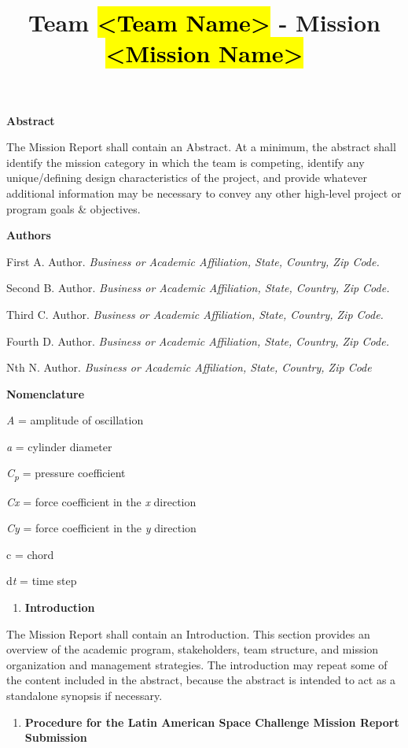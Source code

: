 \documentclass[
]{article}
\title{Team \hl{\textless Team Name\textgreater{}} - Mission
\hl{\textless Mission Name\textgreater{}}}
\author{}
\date{}
\begin{document}
\maketitle

\textbf{Abstract}

The Mission Report shall contain an Abstract. At a minimum, the abstract
shall identify the mission category in which the team is competing,
identify any unique/defining design characteristics of the project, and
provide whatever additional information may be necessary to convey any
other high-level project or program goals \& objectives.

\textbf{Authors}

First A. Author. \emph{Business or Academic Affiliation, State, Country,
Zip Code.}

Second B. Author. \emph{Business or Academic Affiliation, State,
Country, Zip Code.}

Third C. Author. \emph{Business or Academic Affiliation, State, Country,
Zip Code.}

Fourth D. Author. \emph{Business or Academic Affiliation, State,
Country, Zip Code.}

Nth N. Author. \emph{Business or Academic Affiliation, State, Country,
Zip Code}

\textbf{Nomenclature}

\emph{A} = amplitude of oscillation

\emph{a} = cylinder diameter

\emph{C\textsubscript{p}} = pressure coefficient

\emph{Cx} = force coefficient in the \emph{x} direction

\emph{Cy} = force coefficient in the \emph{y} direction

c = chord

d\emph{t} = time step

\begin{enumerate}
\def\labelenumi{\arabic{enumi}.}
\item
  \textbf{Introduction}
\end{enumerate}

The Mission Report shall contain an Introduction. This section provides
an overview of the academic program, stakeholders, team structure, and
mission organization and management strategies. The introduction may
repeat some of the content included in the abstract, because the
abstract is intended to act as a standalone synopsis if necessary.

\begin{enumerate}
\def\labelenumi{\arabic{enumi}.}
\setcounter{enumi}{1}
\item
  \textbf{Procedure for the Latin American Space Challenge Mission
  Report Submission}
\end{enumerate}
\end{document}
